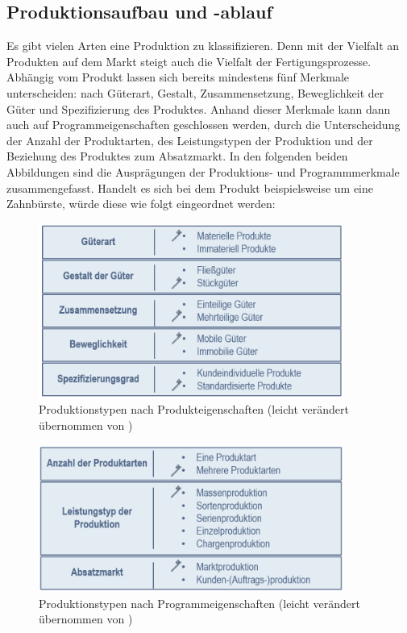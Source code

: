 \documentclass[a4paper,12pt, german]{report}
\begin{document}
\subsection{Produktionsaufbau und -ablauf}
Es gibt vielen Arten eine Produktion zu klassifizieren. Denn mit der Vielfalt an Produkten auf dem Markt steigt auch die Vielfalt der Fertigungsprozesse. Abhängig vom Produkt lassen sich bereits mindestens fünf Merkmale unterscheiden: nach Güterart, Gestalt, Zusammensetzung, Beweglichkeit der Güter und Spezifizierung des Produktes. Anhand dieser Merkmale kann dann auch auf Programmeigenschaften geschlossen werden, durch die Unterscheidung der Anzahl der Produktarten, des Leistungstypen der Produktion und der Beziehung des Produktes zum Absatzmarkt.\cite{07} In den folgenden beiden Abbildungen sind die Ausprägungen der Produktions- und Programmmerkmale zusammengefasst. Handelt es sich bei dem Produkt beispielsweise um eine Zahnbürste, würde diese wie folgt eingeordnet werden:
\begin{figure}[H]
  \center
 \includegraphics[width=10cm]{images/nachProdukt.pptx.png}
  \caption[Produktionstypen nach Produkteigenschaften]{Produktionstypen nach Produkteigenschaften (leicht verändert übernommen von \cite{07})}
\end{figure}
\begin{figure}[H]
  \center
 \includegraphics[width=10cm]{images/nachProgramm.png}
  \caption[Produktionstypen nach Programmeigenschaften]{Produktionstypen nach Programmeigenschaften (leicht verändert übernommen von \cite{07})}
\end{figure}
\end{document}
